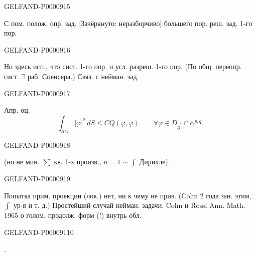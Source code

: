 \begin{GelfandAdjacentEvidence}{GELFAND-P000091}{5}

С пом. полож. опр. зад. [Зачёркнуто: неразборчиво] большего пор. реш. зад. 1-го пор.
\end{GelfandAdjacentEvidence}
\begin{GelfandAdjacentEvidence}{GELFAND-P000091}{6}

Но здесь исп., что сист. 1-го пор. и усл. разреш. 1-го пор.
(По общ. переопр. сист. $\exists$ раб. Спенсера.)
Связ. с нейман. зад.
\end{GelfandAdjacentEvidence}
\begin{GelfandAdjacentEvidence}{GELFAND-P000091}{7}

Апр. оц.
\begin{equation*}
\int_{\partial M}|\varphi|^2\,dS\le C Q(\varphi,\varphi)
\qquad\forall\varphi\in D_{\bar\partial^*}\cap\alpha^{p,q}.
\end{equation*}
\end{GelfandAdjacentEvidence}
\begin{GelfandAdjacentEvidence}{GELFAND-P000091}{8}

(но не мин. $\sum$ кв. 1-х произв., $n=1\sim\int$ Дирихле).
\end{GelfandAdjacentEvidence}
\begin{GelfandAdjacentEvidence}{GELFAND-P000091}{9}

Попытка прим. проекции (лок.) нет, ни к чему не прив.
(Cohn 2 года зан. этим, $\int$ ур-я и т. д.)
Простейший случай нейман. задачи.
Cohn и Rossi Ann. Math. 1965 о голом. продолж. форм (!) внутрь обл.
\end{GelfandAdjacentEvidence}
\begin{GelfandAdjacentEvidence}{GELFAND-P000091}{10}


.
\end{GelfandAdjacentEvidence}
